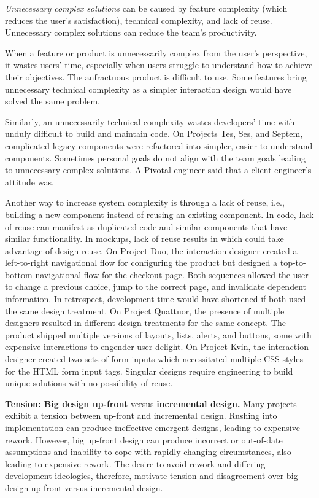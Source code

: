 \textit{Unnecessary complex solutions} can be caused by feature complexity (which reduces the user's satisfaction), technical complexity, and lack of reuse. Unnecessary complex solutions can reduce the team's productivity. 

When a feature or product is unnecessarily complex from the user's perspective, it wastes users' time, especially when users struggle to understand how to achieve their objectives. The anfractuous product is difficult to use. Some features bring unnecessary technical complexity as a simpler interaction design would have solved the same problem. 

Similarly, an unnecessarily technical complexity wastes developers' time with unduly difficult to build and maintain code. On Projects Tes, Ses, and Septem, complicated legacy components were refactored into simpler, easier to understand components. Sometimes personal goals do not align with the team goals leading to unnecessary complex solutions. A Pivotal engineer said that a client engineer's attitude was, 

Another way to increase system complexity is through a lack of reuse, i.e., building a new component instead of reusing an existing component. In code, lack of reuse can manifest as duplicated code and similar components that have similar functionality. In mockups, lack of reuse results in  which could take advantage of design reuse. On Project Duo, the interaction designer created a left-to-right navigational flow for configuring the product but designed a top-to-bottom navigational flow for the checkout page. Both sequences allowed the user to change a previous choice, jump to the correct page, and invalidate dependent information. In retrospect, development time would have shortened if both used the same design treatment. On Project Quattuor, the presence of multiple designers resulted in different design treatments for the same concept. The product shipped multiple versions of layouts, lists, alerts, and buttons, some with expensive interactions to engender user delight. On Project Kvin, the interaction designer created two sets of form inputs which necessitated multiple CSS styles for the HTML form input tags. Singular designs require engineering to build unique solutions with no possibility of reuse.   

\textbf{Tension: Big design up-front} versus \textbf{incremental design.}
Many projects exhibit a tension between up-front and incremental design. Rushing into implementation can produce ineffective emergent designs, leading to expensive rework. However, big up-front design can produce incorrect or out-of-date assumptions and inability to cope with rapidly changing circumstances, also leading to expensive rework. The desire to avoid rework and differing development ideologies, therefore, motivate tension and disagreement over big design up-front versus incremental design. 


